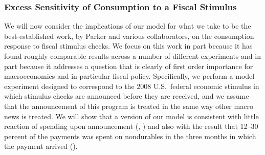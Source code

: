   \hypertarget{Excess-Sensitivity-Experiment}{}
  \subsubsection{Excess Sensitivity of Consumption to a Fiscal Stimulus}

  We will now consider the implications of our model for what we take to be the best-established work, by Parker and various collaborators, on the consumption response to fiscal stimulus checks. We focus on this work in part because it has found roughly comparable results across a number of different experiments and in part because it addresses a question that is clearly of first order importance for macroeconomics and in particular fiscal policy. Specifically, we perform a model experiment designed to correspond to the 2008 U.S.\ federal economic stimulus in which stimulus checks are announced before they are received, and we assume that the announcement of this program is treated in the same way other macro news is treated. We will show that a version of our model is consistent with little reaction of spending upon announcement (\cite{brodaParker}, \cite{parker25million}) and also with the result that 12--30 percent of the payments was spent on nondurables in the three months in which the payment arrived (\cite{psjmMPC2008}).



